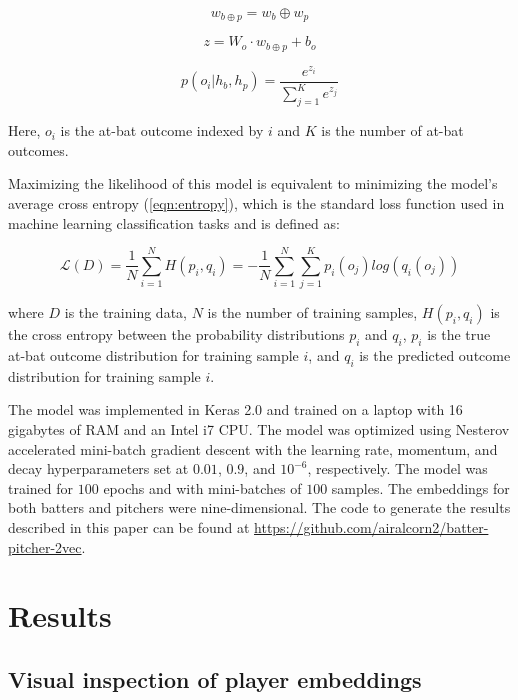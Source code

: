 \documentclass{article}
\begin{document}
\begin{equation}
\label{eqn:concat}
w_{b \oplus p} = w_b \oplus w_p
\end{equation}

\begin{equation}
\label{eqn:output}
z = W_o \cdot w_{b \oplus p} + b_o
\end{equation}

\begin{equation}
\label{eqn:prob}
p(o_i | h_b, h_p) = \frac{e^{z_i}}{\sum_{j=1}^{K} e^{z_j}}
\end{equation}

Here, $o_i$ is the at-bat outcome indexed by $i$ and $K$ is the number of at-bat outcomes.

Maximizing the likelihood of this model is equivalent to minimizing the model's average cross entropy (\ref{eqn:entropy}), which is the standard loss function used in machine learning classification tasks and is defined as:

\begin{equation}
\label{eqn:entropy}
\mathcal{L}(D) = \frac{1}{N}\sum_{i=1}^{N}H(p_i,q_i) = -\frac{1}{N}\sum_{i=1}^{N}\sum_{j=1}^{K} p_i(o_j)log(q_i(o_j))
\end{equation}

where $D$ is the training data, $N$ is the number of training samples, $H(p_i,q_i)$ is the cross entropy between the probability distributions $p_i$ and $q_i$, $p_i$ is the true at-bat outcome distribution for training sample $i$, and $q_i$ is the predicted outcome distribution for training sample $i$.

The model was implemented in Keras 2.0 \parencite{Keras2015} and trained on a laptop with 16 gigabytes of RAM and an Intel i7 CPU. The model was optimized using Nesterov accelerated mini-batch gradient descent with the learning rate, momentum, and decay hyperparameters set at $0.01$, $0.9$, and $10^{-6}$, respectively. The model was trained for $100$ epochs and with mini-batches of $100$ samples. The embeddings for both batters and pitchers were nine-dimensional. The code to generate the results described in this paper can be found at \url{https://github.com/airalcorn2/batter-pitcher-2vec}.

\section{Results}
\label{results}

\subsection{Visual inspection of player embeddings}
\end{document}

